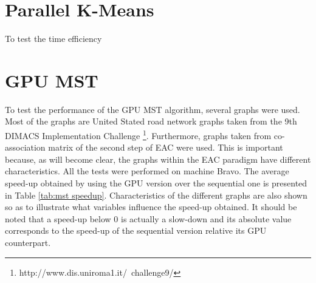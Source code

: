 





%
%

\section{Parallel K-Means}
\label{sec:parallel kmeans}

To test the time efficiency 

%
%

\section{GPU MST}
\label{sec:gpu mst}


To test the performance of the GPU MST algorithm, several graphs were used.
Most of the graphs are United Stated road network graphs taken from the 9th DIMACS Implementation Challenge \footnote{http://www.dis.uniroma1.it/~challenge9/}.
Furthermore, graphs taken from co-association matrix of the second step of EAC were used.
This is important because, as will become clear, the graphs within the EAC paradigm have different characteristics.
All the tests were performed on machine Bravo.
The average speed-up obtained by using the GPU version over the sequential one is presented in Table \ref{tab:mst speedup}.
Characteristics of the different graphs are also shown so as to illustrate what variables influence the speed-up obtained.
It should be noted that a speed-up below 0 is actually a slow-down and its absolute value corresponds to the speed-up of the sequential version relative its GPU counterpart.

